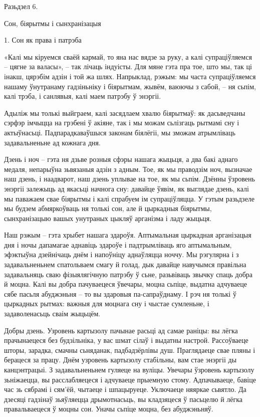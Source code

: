 Разьдзел 6. 

Сон, біярытмы і сынхранізацыя

1. Сон як права і патрэба

«Калі мы кіруемся сваёй кармай, то яна нас вядзе за руку, а калі супраціўляемся – цягне за валасы», – так лічаць індуісты. Для мяне гэта пра тое, што мы, так ці інакш, цярэбім адзін і той жа шлях. Напрыклад, рэжым: мы часта супраціўляемся нашаму ўнутранаму гадзіньніку і біярытмам, жывём, ваюючы з сабой, -- ня сьпім, калі трэба, і санлявыя, калі маем патрэбу ў энэргіі.

Адыліж мы толькі выйграем, калі засядлаем хвалю біярытмаў: як дасьведчаны сэрфэр імчыцца на грэбені ў акіяне, так і мы можам сьлізгаць рытмамі сну і актыўнасьці. Падпарадкаваўшыся законам біялёгіі, мы зможам атрымліваць задавальненьне ад кожнага дня.

Дзень і ноч – гэта ня дзьве розныя сфэры нашага жыцьця, а два бакі аднаго медаля, непарыўна зьвязаныя адзін з адным. Тое, як мы праводзім ноч, вызначае наш дзень, і наадварот, наш дзень уплывае на тое, як мы сьпім. Дзённы ўзровень энэргіі залежыць ад якасьці начнога сну: давайце ўявім, як выглядае дзень, калі мы паважаем свае біярытмы і калі спрабуем ім супраціўляцца. У гэтым разьдзеле мы будзем абмяркоўваць ня толькі сон, але й цыркадныя біярытмы, сынхранізацыю вашых унутраных цыкляў арганізма і ладу жыцьця.

Наш рэжым – гэта хрыбет нашага здароўя. Аптымальная цыркадная арганізацыя дня і ночы дапамагае аднавіць здароўе і падтрымліваць яго аптымальным, эфэктыўна дзейнічаць днём і напоўніцу аднаўляцца ноччу. Мы рэгулярна і з задавальненьнем спатольваем смагу й голад, дык давайце навучымся правільна задавальняць сваю фізыялягічную патрэбу ў сьне, разьвіваць звычку спаць добра й моцна. Калі вы добра пачуваецеся ўвечары, моцна сьпіце, выдатна адчуваеце сябе пасьля абуджэньня – то вы здаровыя па-сапраўднаму. І рэч ня толькі ў цыркадных рытмах: важныя для моцнага сну і чыстае сумленьне, і задаволенасьць сваім жыцьцём.

Добры дзень. Узровень картызолу пачынае расьці ад самае раніцы: вы лёгка прачынаецеся без будзільніка, у вас шмат сілаў і выдатны настрой. Рассоўваеце шторы, зарадка, смачны сьняданак, падбадзёрлівы душ. Праглядаеце свае пляны і берацеся за працу. Днём узровень картызолу стабільны, вам стае энэргіі ды канцэнтрацыі. З задавальненьнем гуляеце на вуліцы. Увечары ўзровень картызолу зьніжаецца, вы расслабляецеся і адчуваеце прыемную стому. Адпачываеце, бавіце час зь сябрамі і сям'ёй, чытаеце і шпацыруеце. Уключаеце няяркае сьвятло. Да дзесяці гадзінаў зьяўляецца дрымотнасьць, вы кладзяцеся ў пасьцелю й лёгка правальваецеся ў моцны сон. Уначы сьпіце моцна, без абуджэньняў.

